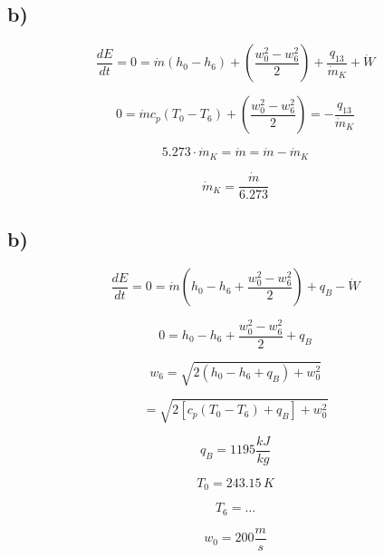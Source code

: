 

\subsection*{b)}

\begin{equation*}
\frac{dE}{dt} = 0 = \dot{m} (h_0 - h_6) + \left( \frac{w_0^2 - w_6^2}{2} \right) + \frac{q_{13}}{\dot{m}_K} + \dot{W}
\end{equation*}

\begin{equation*}
0 = \dot{m} c_p (T_0 - T_6) + \left( \frac{w_0^2 - w_6^2}{2} \right) = - \frac{q_{13}}{\dot{m}_K}
\end{equation*}

\begin{equation*}
5.273 \cdot \dot{m}_K = \dot{m} = \dot{m} - \dot{m}_K
\end{equation*}

\begin{equation*}
\dot{m}_K = \frac{\dot{m}}{6.273}
\end{equation*}



\subsection*{b)}

\[
\frac{dE}{dt} = 0 = \dot{m} \left( h_0 - h_6 + \frac{w_0^2 - w_6^2}{2} \right) + q_{B} - \dot{W}
\]

\[
0 = h_0 - h_6 + \frac{w_0^2 - w_6^2}{2} + q_{B}
\]

\[
w_6 = \sqrt{2 \left( h_0 - h_6 + q_{B} \right) + w_0^2}
\]

\[
= \sqrt{2 \left[ c_p (T_0 - T_6) + q_{B} \right] + w_0^2}
\]

\[
q_{B} = 1195 \frac{kJ}{kg}
\]

\[
T_0 = 243.15 \, K
\]

\[
T_6 = \ldots
\]

\[
w_0 = 200 \frac{m}{s}
\]